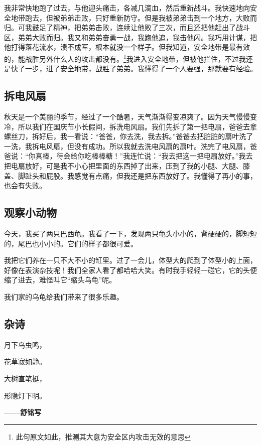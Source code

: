 \documentclass[UTF8,a4paper,titlepage,twoside,10.5pt]{article}
\begin{document}
我非常快地跑了过去，与他迎头痛击，各减几滴血，然后重新战斗。我快速地向安全地带跑去，但被弟弟击败，只好重新防守。但是我被弟弟击到一个地方，大败而归。可我鼓足了精神，把弟弟击败，连续让他败了三次，而且还把他赶出了战斗区，弟弟大败而归。我又和弟弟奋勇一战，我跑他追，我击他闪。我巧用计谋，把他打得落花流水，溃不成军，根本就没一个样子。但我知道，安全地带是最有效的，能战胜另外什么人的攻击都没有。\footnote{此句原文如此，推测其大意为安全区内攻击无效的意思}我进入安全地带，但被他拦住，不过我还是快了一步，进了安全地带，战胜了弟弟。我懂得了一个人要强，那就要有经验。

\subsection{拆电风扇}
\label{sec:org5e6888d}

秋天是一个美丽的季节，经过了一个酷暑，天气渐渐得变凉爽了。因为天气慢慢变冷，所以我们在国庆节小长假间，拆洗电风扇。我们先拆了第一把电扇，爸爸去拿螺丝刀，拆好后，我一看说：“爸爸，你去洗，我去拆。”爸爸去把脏脏的扇叶洗了一洗，我拆电风扇，但没有成功。所以我就去洗电风扇的扇叶。洗完了电风扇，爸爸说：“你真棒，待会给你吃棒棒糖！”我连忙说：“我去把这一把电扇放好。”我去把电扇放好，可是我不小心把里面的东西掉了出来，压到了我的小腿、大腿、膝盖、脚趾头和屁股。我感觉有点痛，但我还是把东西放好了。我懂得了再小的事，也会有失败。

\subsection{观察小动物}
\label{sec:org9eb80c2}

今天，我买了两只巴西龟。我看了一下，发现两只龟头小小的，背硬硬的，脚短短的，尾巴也小小的。它们的样子都很可爱。

我把它们养在一只不大不小的缸里。过了一会儿，体型大的爬到了体型小的上面，好像在表演杂技呢！我们全家人看了都哈哈大笑。有时我手轻轻一碰它，它的头便缩了进去，难怪叫它“缩头乌龟”呢。

我们家的乌龟给我们带来了很多乐趣。

\subsection{杂诗}
\label{sec:org7ee473e}

月下鸟虫鸣，

花草寂如静。

大树直笔挺，

形隐灯下明。

\textbf{——舒铭写}
\end{document}
